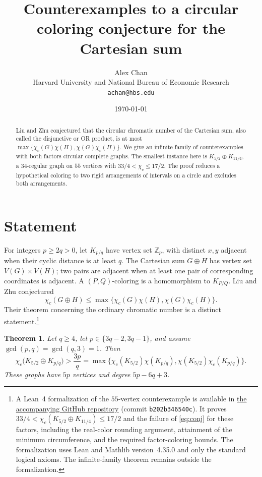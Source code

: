 \documentclass[11pt]{article}
\title{Counterexamples to a circular coloring conjecture for the Cartesian sum}
\author{Alex Chan\\[2pt]
  \small Harvard University and National Bureau of Economic Research\\[-1pt]
  \small \texttt{achan@hbs.edu}}
\date{\today}
\newtheorem{theorem}{Theorem}
\newcommand{\Z}{\mathbb Z}
\newcommand{\cc}{\chi_c}
\begin{document}
\maketitle

\begin{abstract}
Liu and Zhu conjectured that the circular chromatic number of the Cartesian
sum, also called the disjunctive or OR product, is at most
$\max\{\cc(G)\chi(H),\chi(G)\cc(H)\}$.  We give an infinite family of
counterexamples with both factors circular complete graphs.  The smallest
instance here is $K_{5/2}\oplus K_{11/4}$, a $34$-regular graph on $55$
vertices with $33/4<\chi_c\leq17/2$.
The proof reduces a hypothetical coloring to two rigid arrangements of
intervals on a circle and excludes both arrangements.
\end{abstract}

\section{Statement}
For integers $p\geq 2q>0$, let $K_{p/q}$ have vertex set $\Z_p$, with
distinct $x,y$ adjacent when their cyclic distance is at least $q$.  The
Cartesian sum $G\oplus H$ has vertex set $V(G)\times V(H)$; two pairs are
adjacent when at least one pair of corresponding coordinates is adjacent.
A $(P,Q)$-coloring is a homomorphism to $K_{P/Q}$.  Liu and Zhu
\cite{LiuZhu2008} conjectured
\begin{equation}\label{eq:conj}
 \cc(G\oplus H)\leq
 \max\{\cc(G)\chi(H),\chi(G)\cc(H)\}.
\end{equation}
Their theorem concerning the ordinary chromatic number is a
distinct statement.\footnote{A Lean~4 formalization of the $55$-vertex counterexample
is available in
\href{https://github.com/alexgocardinal/liu-zhu-circular-coloring/tree/b202b346540cf09199d7c44ec1886a147dabc5cf}{the accompanying GitHub repository}
(commit \texttt{b202b346540c}). It proves
$33/4<\cc(K_{5/2}\oplus K_{11/4})\leq17/2$ and the failure of
\eqref{eq:conj} for these factors, including the real-color rounding
argument, attainment of the minimum circumference, and the required
factor-coloring bounds. The formalization uses Lean and Mathlib
version~4.35.0 and only the standard logical axioms. The infinite-family
theorem remains outside the formalization.}

\begin{theorem}\label{thm:main}
Let $q\geq4$, let $p\in\{3q-2,3q-1\}$, and assume
$\gcd(p,q)=\gcd(q,3)=1$.  Then
\[
 \cc\bigl(K_{5/2}\oplus K_{p/q}\bigr)>
 \frac{3p}{q}
 =\max\{\cc(K_{5/2})\chi(K_{p/q}),
          \chi(K_{5/2})\cc(K_{p/q})\}.
\]
These graphs have $5p$ vertices and degree $5p-6q+3$.
\end{theorem}
\end{document}
